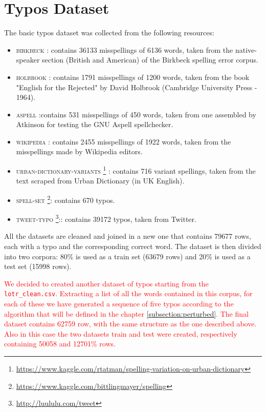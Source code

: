 \section{Typos Dataset}
The basic typos dataset was collected from the following resources:
\begin{itemize}
	\item \textsc{birkbeck}  : contains 
	\num{36133} misspellings of \num{6136} words, taken from the native-speaker section (British and 
	American) of the Birkbeck spelling error corpus.
	\item \textsc{holbrook} : contains \num{1791} misspellings of \num{1200} words, taken from 
	the book "English for the Rejected" by David Holbrook (Cambridge University Press - 1964).
	\item \textsc{aspell}  :contains \num{531} misspellings of \num{450} words, taken from one 
	assembled by Atkinson for testing the GNU Aspell spellchecker.
	\item \textsc{wikipedia} : contains \num{2455} misspellings of \num{1922} words, taken from 
	the misspellings made by Wikipedia editors.
	\item \textsc{urban-dictionary-variants} 
	\footnote{\url{https://www.kaggle.com/rtatman/spelling-variation-on-urban-dictionary}}  : contains 
	\num{716} variant 
	spellings, taken from the text scraped from Urban Dictionary (in UK English).
	\item \textsc{spell-set} \footnote{\url{https://www.kaggle.com/bittlingmayer/spelling}}: contains 
	\num{670} typos.
	\item \textsc{tweet-typo} \footnote{\url{http://luululu.com/tweet}}:: contains \num{39172} typos, taken 
	from Twitter.
\end{itemize}

All the datasets are cleaned and joined in a new one that contains \num{79677} rows, each with a typo and the 
corresponding correct word.
The dataset is then divided into two corpora: \num{80}\% is used as a train set (\num{63679} rows) and 
\num{20}\% is used as a test set (\num{15998} rows).


\textcolor{red}{
	We decided to created another dataset of typos starting from the \\\texttt{lotr\_clean.csv}. 
	Extracting a list of all the words contained in this corpus, for each of these we have generated a sequence of 
	five typos according to the algorithm that will be defined in the chapter \ref{subsection:perturbed}.
	The final dataset contains \num{62759} row, with the same structure as the one described above.
	Also in this case the two datasets train and test were created, respectively containing \num{50058} and 
	\num{12701}\% rows.}

